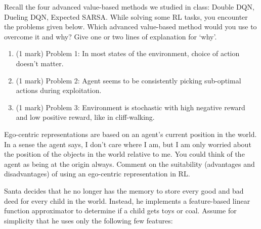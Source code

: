 \documentclass[addpoints,12pt,solution]{exam}
\begin{document}
    \begin{questions}

        \question[3] Recall the four advanced value-based methods we studied in class: Double DQN, Dueling DQN, Expected SARSA.
        While solving some RL tasks, you encounter the problems given below. Which advanced value-based method would you use to overcome it and why? Give one or two lines of explanation for `why’.
        \begin{enumerate}[label=(\alph*)]
            \item (1 mark) Problem 1: In most states of the environment, choice of action doesn’t matter.
            \begin{solution}

            \end{solution}
            \item (1 mark) Problem 2: Agent seems to be consistently picking sub-optimal actions during exploitation.
            \begin{solution}

            \end{solution}
            \item (1 mark) Problem 3: Environment is stochastic with high negative reward and low positive reward, like in cliff-walking.
            \begin{solution}

            \end{solution}
        \end{enumerate}


        \question[4] Ego-centric representations are based on an agent’s current position in the world. In a sense the agent says, I don’t care where I am, but I am only worried about the position of the objects in the world relative to me. You could think of the agent as being at the origin always. Comment on the suitability (advantages and disadvantages) of using an ego-centric representation in RL.

        \begin{solution}


        \end{solution}

        \question[12]
        Santa decides that he no longer has the memory to store every good and bad deed for every child in the world. Instead, he implements a feature-based linear function approximator to determine if a child gets toys or coal. Assume for simplicity that he uses only the following few features:


\end{questions}
\end{document}
